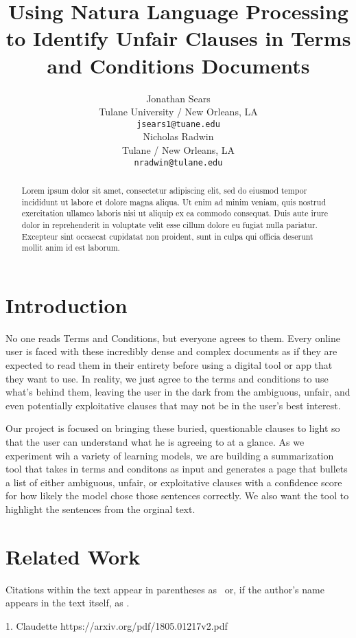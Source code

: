 \documentclass[11pt,a4paper]{article}
\title{Using Natura Language Processing to Identify Unfair Clauses in Terms and Conditions Documents}
\author{Jonathan Sears\\
  Tulane University / New Orleans, LA \\
  \texttt{jsears1@tuane.edu} \\\And
  Nicholas Radwin \\
  Tulane  / New Orleans, LA\\
  \texttt{nradwin@tulane.edu} \\}
\date{}
\begin{document}
\maketitle
\begin{abstract}
Lorem ipsum dolor sit amet, consectetur adipiscing elit, sed do eiusmod tempor incididunt ut labore et dolore magna aliqua. Ut enim ad minim veniam, quis nostrud exercitation ullamco laboris nisi ut aliquip ex ea commodo consequat. Duis aute irure dolor in reprehenderit in voluptate velit esse cillum dolore eu fugiat nulla pariatur. Excepteur sint occaecat cupidatat non proident, sunt in culpa qui officia deserunt mollit anim id est laborum.
\end{abstract}


\section{Introduction}

No one reads Terms and Conditions, but everyone agrees to them. Every online user is faced with these
incredibly dense and complex documents as if they are expected to read them in their entirety before
using a digital tool or app that they want to use. In reality, we just agree to the terms and conditions
to use what's behind them, leaving the user in the dark from the ambiguous, unfair, and even potentially
exploitative clauses that may not be in the user's best interest. 

Our project is focused on bringing these buried, questionable clauses to light so that the user can understand 
what he is agreeing to at a glance. As we experiment wih a variety of learning models, we are building a
summarization tool that takes in terms and conditons as input and generates a page that bullets a list of 
either ambiguous, unfair, or exploitative clauses with a confidence score for how likely the model chose 
those sentences correctly. We also want the tool to highlight the sentences from the orginal text.

\section{Related Work}

Citations within the text appear in parentheses as~\citep{aho1972theory} or, if the author's name appears in the text itself, as \citet{andrew2007scalable}.

1. Claudette
https://arxiv.org/pdf/1805.01217v2.pdf
\end{document}
